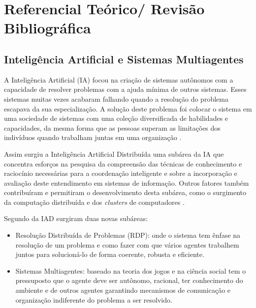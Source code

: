 \chapter{Referencial Teórico/ Revisão Bibliográfica}

\section{Inteligência Artificial e Sistemas Multiagentes}
% 
% 
% 
  A Inteligência Artificial (IA) focou na criação de sistemas autônomos com a capacidade de resolver problemas com a ajuda mínima de outros sistemas. Esses sistemas muitas vezes acabaram falhando quando a resolução do problema escapava da sua especialização. A solução deste problema foi colocar o sistema em uma sociedade de sistemas com uma coleção diversificada de habilidades e capacidades, da mesma forma que as pessoas superam as limitações dos indivíduos quando trabalham juntas em uma organização \cite{durfee1991distributed}. 

Assim surgiu a Inteligência Artificial Distribuída uma subárea da IA que concentra esforços na pesquisa da compreensão das técnicas de conhecimento e raciocínio necessárias para a coordenação inteligente e sobre a incorporação e avaliação deste entendimento em sistemas de informação. Outros fatores também contribuíram e permitiram o desenvolvimento desta subárea, como o surgimento da computação distribuída e dos \textit{clusters} de computadores \cite{durfee1991distributed,bond2014readings}.

Segundo \cite{durfee1994distributed} da IAD surgiram duas novas subáreas:

\begin{itemize}
\item Resolução Distribuída de Problemas (RDP): onde o sistema tem ênfase na resolução de um problema e como fazer com que vários agentes trabalhem juntos para solucioná-lo de forma coerente, robusta e eficiente.

\item Sistemas Multiagentes: baseado na teoria dos jogos e na ciência social tem o pressuposto que o agente deve ser autônomo, racional, ter conhecimento do ambiente e de outros agentes garantindo mecanismos de comunicação e organização indiferente do problema a ser resolvido.
\end{itemize}


